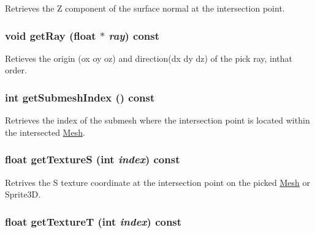 Retrieves the Z component of the surface normal at the intersection point. \hypertarget{classm3g_1_1RayIntersection_3f4d1f2f24c0dadab914014836e1b138}{
\subsubsection[{getRay}]{\setlength{\rightskip}{0pt plus 5cm}void getRay (float $\ast$ {\em ray}) const}}
\label{classm3g_1_1RayIntersection_3f4d1f2f24c0dadab914014836e1b138}


Retieves the origin (ox oy oz) and direction(dx dy dz) of the pick ray, inthat order. \hypertarget{classm3g_1_1RayIntersection_6a11c61d1a1fecc01f2f83463404a6b8}{
\subsubsection[{getSubmeshIndex}]{\setlength{\rightskip}{0pt plus 5cm}int getSubmeshIndex () const}}
\label{classm3g_1_1RayIntersection_6a11c61d1a1fecc01f2f83463404a6b8}


Retrieves the index of the submesh where the intersection point is located within the intersected \hyperlink{classm3g_1_1Mesh}{Mesh}. \hypertarget{classm3g_1_1RayIntersection_bc14e1d5a83d5fca608b1fbf772614d4}{
\subsubsection[{getTextureS}]{\setlength{\rightskip}{0pt plus 5cm}float getTextureS (int {\em index}) const}}
\label{classm3g_1_1RayIntersection_bc14e1d5a83d5fca608b1fbf772614d4}


Retrives the S texture coordinate at the intersection point on the picked \hyperlink{classm3g_1_1Mesh}{Mesh} or Sprite3D. \hypertarget{classm3g_1_1RayIntersection_843d5b907bb54a6f28571f0a0f14c932}{
\subsubsection[{getTextureT}]{\setlength{\rightskip}{0pt plus 5cm}float getTextureT (int {\em index}) const}}
\label{classm3g_1_1RayIntersection_843d5b907bb54a6f28571f0a0f14c932}


